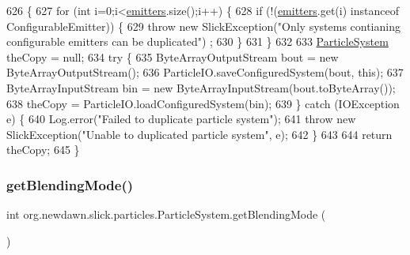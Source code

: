 \begin{DoxyCode}
626                                                             \{
627         \textcolor{keywordflow}{for} (\textcolor{keywordtype}{int} i=0;i<\mbox{\hyperlink{classorg_1_1newdawn_1_1slick_1_1particles_1_1_particle_system_aee956700fc1881201435275fdd6fc32b}{emitters}}.size();i++) \{
628             \textcolor{keywordflow}{if} (!(\mbox{\hyperlink{classorg_1_1newdawn_1_1slick_1_1particles_1_1_particle_system_aee956700fc1881201435275fdd6fc32b}{emitters}}.get(i) instanceof ConfigurableEmitter)) \{
629                 \textcolor{keywordflow}{throw} \textcolor{keyword}{new} SlickException(\textcolor{stringliteral}{"Only systems contianing configurable emitters can be duplicated"})
      ;
630             \}
631         \}
632     
633         \mbox{\hyperlink{classorg_1_1newdawn_1_1slick_1_1particles_1_1_particle_system_a03c5c4ad49a3db42ebb36e87d2a18583}{ParticleSystem}} theCopy = null;
634         \textcolor{keywordflow}{try} \{
635             ByteArrayOutputStream bout = \textcolor{keyword}{new} ByteArrayOutputStream();
636             ParticleIO.saveConfiguredSystem(bout, \textcolor{keyword}{this});
637             ByteArrayInputStream bin = \textcolor{keyword}{new} ByteArrayInputStream(bout.toByteArray());
638             theCopy = ParticleIO.loadConfiguredSystem(bin);
639         \} \textcolor{keywordflow}{catch} (IOException e) \{
640             Log.error(\textcolor{stringliteral}{"Failed to duplicate particle system"});
641             \textcolor{keywordflow}{throw} \textcolor{keyword}{new} SlickException(\textcolor{stringliteral}{"Unable to duplicated particle system"}, e);
642         \}
643         
644         \textcolor{keywordflow}{return} theCopy;
645     \}
\end{DoxyCode}
\mbox{\label{classorg_1_1newdawn_1_1slick_1_1particles_1_1_particle_system_a236dff7c4fa345081ab47b125585a143}} 
\subsubsection{\texorpdfstring{get\+Blending\+Mode()}{getBlendingMode()}}
{\footnotesize\ttfamily int org.\+newdawn.\+slick.\+particles.\+Particle\+System.\+get\+Blending\+Mode (\begin{DoxyParamCaption}{ }\end{DoxyParamCaption})\hspace{0.3cm}{\ttfamily [inline]}}

